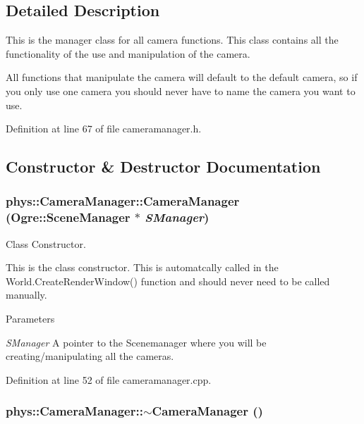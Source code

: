 \subsection{Detailed Description}
This is the manager class for all camera functions. This class contains all the functionality of the use and manipulation of the camera. \par
 All functions that manipulate the camera will default to the default camera, so if you only use one camera you should never have to name the camera you want to use. 

Definition at line 67 of file cameramanager.h.



\subsection{Constructor \& Destructor Documentation}
\hypertarget{classphys_1_1CameraManager_aff47d21e0c80b2b1b44148b0ec7de344}{
\subsubsection[{CameraManager}]{\setlength{\rightskip}{0pt plus 5cm}phys::CameraManager::CameraManager (Ogre::SceneManager $\ast$ {\em SManager})}}
\label{d9/d91/classphys_1_1CameraManager_aff47d21e0c80b2b1b44148b0ec7de344}


Class Constructor. 

This is the class constructor. This is automatcally called in the World.CreateRenderWindow() function and should never need to be called manually. 
\begin{DoxyParams}{Parameters}
\item[{\em SManager}]A pointer to the Scenemanager where you will be creating/manipulating all the cameras. \end{DoxyParams}


Definition at line 52 of file cameramanager.cpp.

\hypertarget{classphys_1_1CameraManager_a0b0f032477309eb47b0302fd5eef198c}{
\subsubsection[{$\sim$CameraManager}]{\setlength{\rightskip}{0pt plus 5cm}phys::CameraManager::$\sim$CameraManager ()}}
\label{d9/d91/classphys_1_1CameraManager_a0b0f032477309eb47b0302fd5eef198c}


